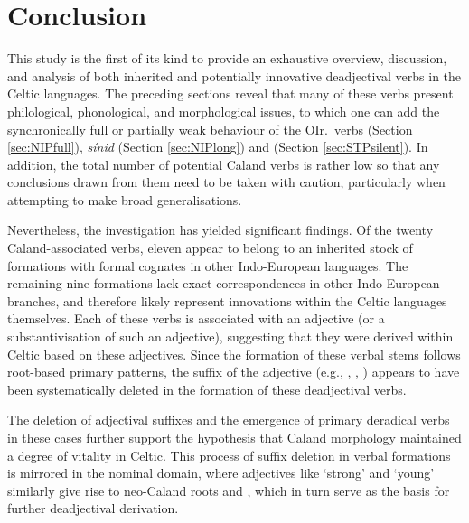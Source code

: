 \documentclass[output=paper,colorlinks,citecolor=brown]{langscibook}
\begin{document}
\section{Conclusion} 
\label{sec:CelticConclusion}
This study is the first of its kind to provide an exhaustive overview, discussion, and analysis of both inherited and potentially innovative deadjectival verbs in the Celtic languages. The preceding sections reveal that many of these verbs present philological, phonological, and morphological issues, to which one can add the synchronically full or partially weak behaviour of the OIr.\  verbs  (Section \ref{sec:NIPfull}), \textit{sínid}  (Section \ref{sec:NIPlong}) and  (Section \ref{sec:STPsilent}). In addition, the total number of potential Caland verbs   is rather low so that any conclusions drawn from them need to be taken with caution, particularly when attempting to make broad generalisations.

Nevertheless, the investigation has yielded significant findings. Of the twenty Caland-associated verbs,  eleven appear to belong to an inherited stock of formations with formal cognates in other Indo-European languages. The remaining nine formations lack exact correspondences in other Indo-European branches, and therefore likely represent innovations within the Celtic languages themselves. Each of these verbs is associated with an adjective (or a substantivisation of such an adjective), suggesting that they were derived within Celtic based on these adjectives. Since the formation of these verbal stems follows root-based primary patterns, the suffix of the adjective (e.g., , , ) appears to have been systematically deleted in the formation of these deadjectival verbs.

The deletion of adjectival suffixes and the emergence of primary deradical verbs in these cases further support the hypothesis that Caland morphology   maintained a degree of vitality in Celtic. This process of suffix deletion in verbal formations is mirrored in the nominal domain, where adjectives like  ‘strong’ and  ‘young’ similarly give rise to neo-Caland roots  and , which in turn serve as the basis for further deadjectival derivation. 
\end{document}
